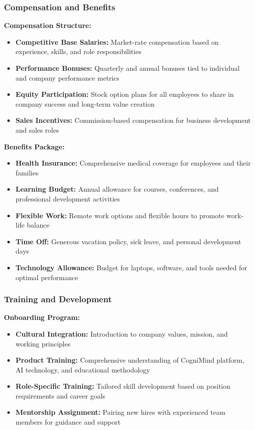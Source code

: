 \subsubsection{Compensation and Benefits}
\textbf{Compensation Structure:}
\begin{itemize}
    \item \textbf{Competitive Base Salaries:} Market-rate compensation based on experience, skills, and role responsibilities
    \item \textbf{Performance Bonuses:} Quarterly and annual bonuses tied to individual and company performance metrics
    \item \textbf{Equity Participation:} Stock option plans for all employees to share in company success and long-term value creation
    \item \textbf{Sales Incentives:} Commission-based compensation for business development and sales roles
\end{itemize}

\textbf{Benefits Package:}
\begin{itemize}
    \item \textbf{Health Insurance:} Comprehensive medical coverage for employees and their families
    \item \textbf{Learning Budget:} Annual allowance for courses, conferences, and professional development activities
    \item \textbf{Flexible Work:} Remote work options and flexible hours to promote work-life balance
    \item \textbf{Time Off:} Generous vacation policy, sick leave, and personal development days
    \item \textbf{Technology Allowance:} Budget for laptops, software, and tools needed for optimal performance
\end{itemize}

\subsubsection{Training and Development}
\textbf{Onboarding Program:}
\begin{itemize}
    \item \textbf{Cultural Integration:} Introduction to company values, mission, and working principles
    \item \textbf{Product Training:} Comprehensive understanding of CogniMind platform, AI technology, and educational methodology
    \item \textbf{Role-Specific Training:} Tailored skill development based on position requirements and career goals
    \item \textbf{Mentorship Assignment:} Pairing new hires with experienced team members for guidance and support
\end{itemize}

